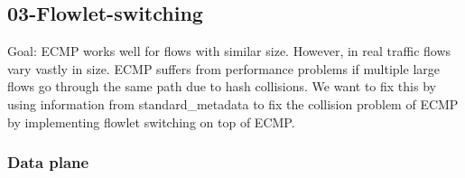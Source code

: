 \documentclass[11pt,oneside,a4paper]{article}
\begin{document}
\subsection{03-Flowlet-switching}

Goal: ECMP works well for flows with similar size. However, in real traffic flows vary vastly in size. ECMP suffers from performance problems if multiple large flows go through the same path due to hash collisions. We want to fix this by using information from standard\_metadata to fix the collision problem of ECMP by implementing flowlet switching on top of ECMP.

\subsubsection{Data plane}
\end{document}
